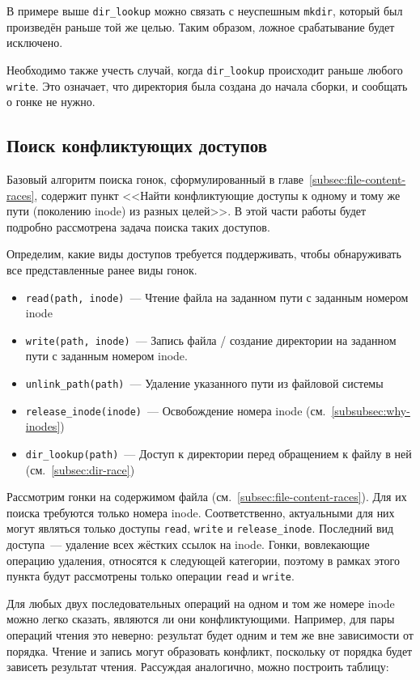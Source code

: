 В примере выше \texttt{dir\_lookup} можно связать с неуспешным \texttt{mkdir}, который был произведён раньше той же целью. Таким образом, ложное срабатывание будет исключено.

Необходимо также учесть случай, когда \texttt{dir\_lookup} происходит раньше любого \texttt{write}. Это означает, что директория была создана до начала сборки, и сообщать о гонке не нужно.

\subsection{Поиск конфликтующих доступов}
\label{subsec:cricital-accesses}

Базовый алгоритм поиска гонок, сформулированный в главе~\ref{subsec:file-content-races}, содержит пункт <<Найти конфликтующие доступы к одному и тому же пути (поколению inode) из разных целей>>. В этой части работы будет подробно рассмотрена задача поиска таких доступов.

Определим, какие виды доступов требуется поддерживать, чтобы обнаруживать все представленные ранее виды гонок.

\begin{itemize}
    \item \texttt{read(path, inode)}~--- Чтение файла на заданном пути с заданным номером inode
    \item \texttt{write(path, inode)}~--- Запись файла / создание директории на заданном пути с заданным номером inode.
    \item \texttt{unlink\_path(path)}~--- Удаление указанного пути из файловой системы
    \item \texttt{release\_inode(inode)}~--- Освобождение номера inode (см.~\ref{subsubsec:why-inodes})
    \item \texttt{dir\_lookup(path)}~--- Доступ к директории перед обращением к файлу в ней (см.~\ref{subsec:dir-race})
\end{itemize}

Рассмотрим гонки на содержимом файла (см.~\ref{subsec:file-content-races}). Для их поиска требуются только номера inode. Соответственно, актуальными для них могут являться только доступы \texttt{read}, \texttt{write} и \texttt{release\_inode}. Последний вид доступа~--- удаление всех жёстких ссылок на inode. Гонки, вовлекающие операцию удаления, относятся к следующей категории, поэтому в рамках этого пункта будут рассмотрены только операции \texttt{read} и \texttt{write}.

Для любых двух последовательных операций на одном и том же номере inode можно легко сказать, являются ли они конфликтующими. Например, для пары операций чтения это неверно: результат будет одним и тем же вне зависимости от порядка. Чтение и запись могут образовать конфликт, поскольку от порядка будет зависеть результат чтения. Рассуждая аналогично, можно построить таблицу:

